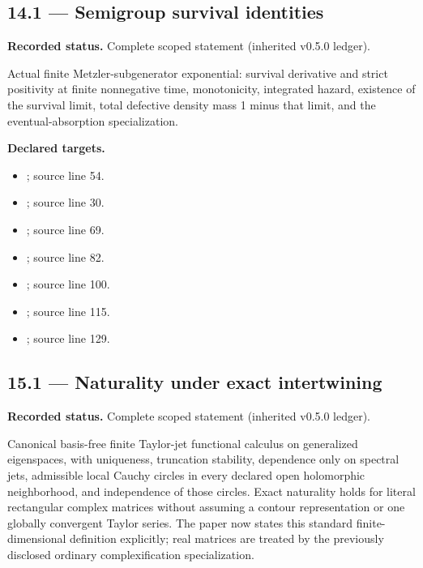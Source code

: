 \subsection{14.1 — Semigroup survival identities}
\label{result:14.1}
\textbf{Recorded status.} Complete scoped statement (inherited v0.5.0 ledger).\par
Actual finite Metzler-subgenerator exponential: survival derivative and strict positivity at finite nonnegative time, monotonicity, integrated hazard, existence of the survival limit, total defective density mass 1 minus that limit, and the eventual-absorption specialization.

\textbf{Declared targets.}\begin{itemize}
\item {}; source line 54.
\item {}; source line 30.
\item {}; source line 69.
\item {}; source line 82.
\item {}; source line 100.
\item {}; source line 115.
\item {}; source line 129.
\end{itemize}
\subsection{15.1 — Naturality under exact intertwining}
\label{result:15.1}
\textbf{Recorded status.} Complete scoped statement (inherited v0.5.0 ledger).\par
Canonical basis-free finite Taylor-jet functional calculus on generalized eigenspaces, with uniqueness, truncation stability, dependence only on spectral jets, admissible local Cauchy circles in every declared open holomorphic neighborhood, and independence of those circles. Exact naturality holds for literal rectangular complex matrices without assuming a contour representation or one globally convergent Taylor series. The paper now states this standard finite-dimensional definition explicitly; real matrices are treated by the previously disclosed ordinary complexification specialization.

